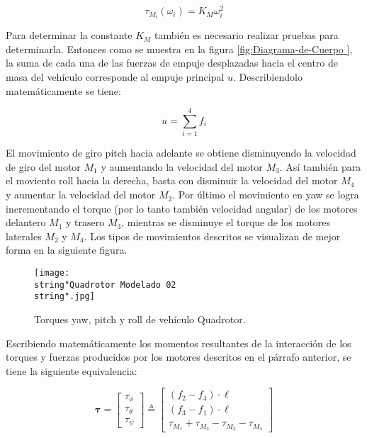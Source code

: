 \documentclass[\main/main.tex]{subfiles}
\begin{document}
\begin{equation}
\tau_{M_{i}}(\omega_{i})=K_{M}\omega_{i}^{2}
\end{equation}

Para determinar la constante $K_{M}$ también es necesario realizar
pruebas para determinarla.
Entonces como se muestra en la figura \ref{fig:Diagrama-de-Cuerpo },
la suma de cada una de las fuerzas de empuje desplazadas hacia el
centro de masa del vehículo corresponde al empuje principal $u.$
Describiendolo matemáticamente se tiene:

\begin{equation}
u=\sum_{i=1}^{4}f_{i}\label{eq:Empuje Total}
\end{equation}

El movimiento de giro pitch hacia adelante se obtiene disminuyendo
la velocidad de giro del motor $M_{1}$ y aumentando la velocidad
del motor $M_{3}$. Así también para el moviento roll hacia la derecha,
basta con disminuir la velocidad del motor $M_{4}$ y aumentar la
velocidad del motor $M_{2}$. Por último el movimiento en yaw se logra
incrementando el torque (por lo tanto también velocidad angular) de
los motores delantero $M_{1}$ y trasero $M_{3}$, mientras se disminuye
el torque de los motores laterales $M_{2}$ y $M_{4}$. Los tipos
de movimientos descritos se visualizan de mejor forma en la siguiente
figura.

\begin{figure}[H]
\noindent \begin{centering}
\texttt{[image: \\string"Quadrotor Modelado 02\\string".jpg]}
\par\end{centering}
\caption{Torques yaw, pitch y roll de vehículo Quadrotor.}
\end{figure}

\textcompwordmark{}

Escribiendo matemáticamente los momentos resultantes de la interacción
de los torques y fuerzas producidos por los motores descritos en el
párrafo anterior, se tiene la siguiente equivalencia:

\begin{equation}
\mathbf{\tau}=\left[\begin{array}{c}
\tau_{\phi}\\
\tau_{\theta}\\
\tau_{\psi}
\end{array}\right]\triangleq\begin{bmatrix}(f_{2}-f_{4})\cdot\ell\\
(f_{3}-f_{1})\cdot\ell\\
\tau_{M_{1}}+\tau_{M_{3}}-\tau_{M_{2}}-\tau_{M_{4}}
\end{bmatrix}\label{eq:Momentos Rotacionales}
\end{equation}
\end{document}

